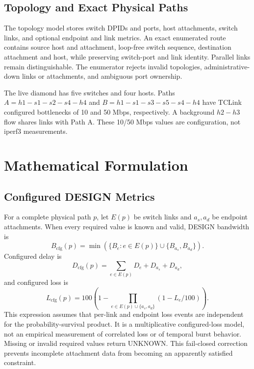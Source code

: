 \documentclass[conference]{IEEEtran}
\begin{document}
\subsection{Topology and Exact Physical Paths}
The topology model stores switch DPIDs and ports, host attachments, switch
links, and optional endpoint and link metrics. An exact enumerated route
contains source host and attachment, loop-free switch sequence, destination
attachment and host, while preserving switch-port and link identity.
Parallel links remain distinguishable. The enumerator rejects invalid
topologies, administrative-down links or attachments, and ambiguous port
ownership.

The live diamond has five switches and four hosts. Paths
$A=h1-s1-s2-s4-h4$ and $B=h1-s1-s3-s5-s4-h4$ have TCLink configured
bottlenecks of 10 and 50 Mbps, respectively. A background $h2-h3$ flow
shares links with Path A. These 10/50 Mbps values are configuration, not
iperf3 measurements.

\section{Mathematical Formulation}
\subsection{Configured DESIGN Metrics}
For a complete physical path $p$, let $E(p)$ be switch links and $a_s,a_d$
be endpoint attachments. When every required value is known and valid,
DESIGN bandwidth is
\begin{equation}
B_{\mathrm{cfg}}(p)=\min\left(
\{B_e:e\in E(p)\}\cup\{B_{a_s},B_{a_d}\}\right).
\end{equation}
Configured delay is
\begin{equation}
D_{\mathrm{cfg}}(p)=\sum_{e\in E(p)}D_e+D_{a_s}+D_{a_d},
\end{equation}
and configured loss is
\begin{equation}
L_{\mathrm{cfg}}(p)=100\left(1-\prod_{e\in E(p)\cup\{a_s,a_d\}}
(1-L_e/100)\right).
\end{equation}
This expression assumes that per-link and endpoint loss events are
independent for the probability-survival product. It is a multiplicative
configured-loss model, not an empirical measurement of correlated loss or
of temporal burst behavior.
Missing or invalid required values return UNKNOWN. This fail-closed
correction prevents incomplete attachment data from becoming an apparently
satisfied constraint.
\end{document}
